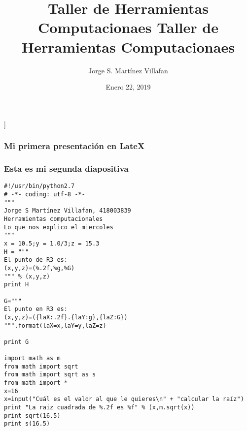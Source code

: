 \documentclass{beamer}
\title{ Taller de Herramientas Computacionaes}
\title{ Taller de Herramientas Computacionaes}
\author{Jorge S. Martínez Villafan}
\date{Enero 22, 2019}
\begin{document}
]
	\maketitle
\begin{frame}
\frametitle{Mi primera presentación en LateX}
\end{frame}

\begin{frame}
\frametitle {
Esta es mi segunda diapositiva}
\end{frame}
\begin{frame}[fragile]
\begin{verbatim}
#!/usr/bin/python2.7
# -*- coding: utf-8 -*-
"""
Jorge S Martínez Villafan, 418003839
Herramientas computacionales
Lo que nos explico el miercoles
"""
x = 10.5;y = 1.0/3;z = 15.3
H = """
El punto de R3 es:
(x,y,z)=(%.2f,%g,%G)
""" % (x,y,z)
print H

G="""
El punto en R3 es:
(x,y,z)=({laX:.2f}.{laY:g},{laZ:G})
""".format(laX=x,laY=y,laZ=z)

print G

import math as m
from math import sqrt
from math import sqrt as s
from math import *
x=16
x=input("Cuál es el valor al que le quieres\n" + "calcular la raíz")
print "La raiz cuadrada de %.2f es %f" % (x,m.sqrt(x))
print sqrt(16.5)
print s(16.5)

\end{verbatim}
\end{frame}
\end{document}

